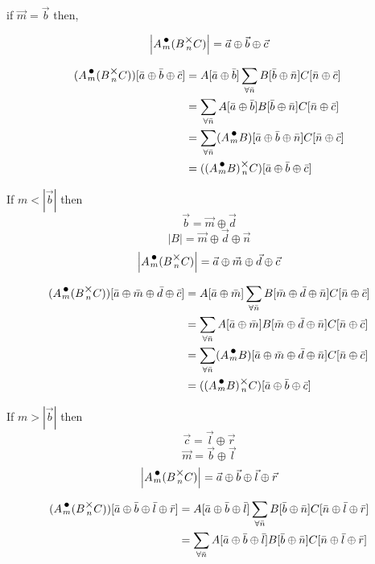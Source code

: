 \documentclass[12pt]{book}
\theoremstyle{plain}
\theoremstyle{definition}
\theoremstyle{ppart}
\theoremstyle{case}
\theoremstyle{solution}
\newcommand{\mmult}[1]{\text{\raisebox{1ex}{$\underset{#1}{\times}$}}}
\newcommand{\dmult}[1]{\text{\raisebox{1ex}{$\underset{#1}{\,\bullet\,}$}}}
\newcommand{\shape}[1]{\left|#1\right|}
\begin{document}
\begin{appendices}
if $\vec{m} = \vec{b}$ then,

\[ \shape{A \dmult{m} (B \mmult{n} C)} = \vec{a} \oplus \vec{b} \oplus \vec{c} \]

\begin{align*}
(A \dmult{m} (B \mmult{n} C))[\bar{a} \oplus \bar{b} \oplus \bar{c}]
  &=
  A[\bar{a} \oplus \bar{b}] \sum_{\forall \bar{n}} B[\bar{b} \oplus \bar{n}] C[\bar{n} \oplus \bar{c}] \\
  &=
  \sum_{\forall \bar{n}} A[\bar{a} \oplus \bar{b}] B[\bar{b} \oplus \bar{n}] C[\bar{n} \oplus \bar{c}] \\
  &=
  \sum_{\forall \bar{n}} (A \dmult{m} B)[\bar{a} \oplus \bar{b} \oplus \bar{n}] C[\bar{n} \oplus \bar{c}] \\
  &= ((A \dmult{m} B) \mmult{n} C)[\bar{a} \oplus \bar{b} \oplus \bar{c}]
\end{align*}

If $m < \shape{\vec{b}}$ then
\[ \vec{b} = \vec{m} \oplus \vec{d} \]
\[ \shape{B} = \vec{m} \oplus \vec{d} \oplus \vec{n} \]
\[ \shape{A \dmult{m} (B \mmult{n} C)} = \vec{a} \oplus \vec{m} \oplus \vec{d} \oplus \vec{c} \]

\begin{align*}
(A \dmult{m} (B \mmult{n} C))[\bar{a} \oplus \bar{m} \oplus \bar{d} \oplus \bar{c}]
  &=
  A[\bar{a} \oplus \bar{m}] \sum_{\forall \bar{n}} B[\bar{m} \oplus \bar{d} \oplus \bar{n}] C[\bar{n} \oplus \bar{c}] \\
  &=
  \sum_{\forall \bar{n}} A[\bar{a} \oplus \bar{m}] B[\bar{m} \oplus \bar{d} \oplus \bar{n}] C[\bar{n} \oplus \bar{c}] \\
  &=
  \sum_{\forall \bar{n}} (A \dmult{m} B)[\bar{a} \oplus \bar{m} \oplus \bar{d} \oplus \bar{n}] C[\bar{n} \oplus \bar{c}] \\
  &= ((A \dmult{m} B) \mmult{n} C)[\bar{a} \oplus \bar{b} \oplus \bar{c}]
\end{align*}

If $m > \shape{\vec{b}}$ then
\[ \vec{c} = \vec{l} \oplus \vec{r} \]
\[ \vec{m} = \vec{b} \oplus \vec{l} \]
\[ \shape{A \dmult{m} (B \mmult{n} C)} = \vec{a} \oplus \vec{b} \oplus \vec{l} \oplus \vec{r} \]

\begin{align*}
(A \dmult{m} (B \mmult{n} C))[\bar{a} \oplus \bar{b} \oplus \bar{l} \oplus \bar{r}]
  &=
  A[\bar{a} \oplus \bar{b} \oplus \bar{l}] \sum_{\forall \bar{n}} B[\bar{b} \oplus \bar{n}] C[\bar{n} \oplus \bar{l} \oplus \bar{r}] \\
  &=
  \sum_{\forall \bar{n}} A[\bar{a} \oplus \bar{b} \oplus \bar{l}] B[\bar{b} \oplus \bar{n}] C[\bar{n} \oplus \bar{l} \oplus \bar{r}] \\
\end{align*}


\end{appendices}
\end{document}
